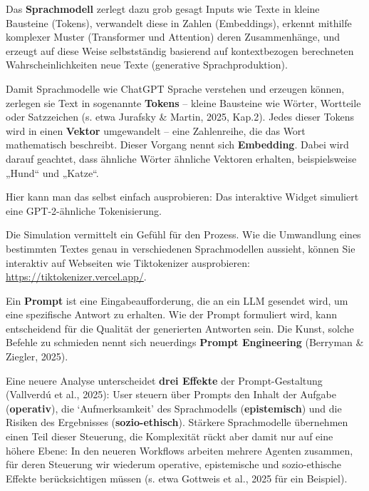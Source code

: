 \documentclass[
  ngerman,
  letterpaper,
  DIV=11]{scrreprt}
\begin{document}
Das \textbf{Sprachmodell} zerlegt dazu grob gesagt Inputs wie Texte in
kleine Bausteine (Tokens), verwandelt diese in Zahlen (Embeddings),
erkennt mithilfe komplexer Muster (Transformer und Attention) deren
Zusammenhänge, und erzeugt auf diese Weise selbstständig basierend auf
kontextbezogen berechneten Wahrscheinlichkeiten neue Texte (generative
Sprachproduktion).

Damit Sprachmodelle wie ChatGPT Sprache verstehen und erzeugen können,
zerlegen sie Text in sogenannte \textbf{Tokens} -- kleine Bausteine wie
Wörter, Wortteile oder Satzzeichen (s. etwa Jurafsky \& Martin, 2025,
Kap.2). Jedes dieser Tokens wird in einen \textbf{Vektor} umgewandelt --
eine Zahlenreihe, die das Wort mathematisch beschreibt. Dieser Vorgang
nennt sich \textbf{Embedding}. Dabei wird darauf geachtet, dass ähnliche
Wörter ähnliche Vektoren erhalten, beispielsweise „Hund`` und „Katze``.

Hier kann man das selbst einfach ausprobieren: Das interaktive Widget
simuliert eine GPT-2-ähnliche Tokenisierung.

\begin{tcolorbox}[enhanced jigsaw, left=2mm, bottomrule=.15mm, arc=.35mm, rightrule=.15mm, colframe=quarto-callout-tip-color-frame, coltitle=black, colback=white, toprule=.15mm, toptitle=1mm, colbacktitle=quarto-callout-tip-color!10!white, title=\textcolor{quarto-callout-tip-color}{\faLightbulb}\hspace{0.5em}{Geben Sie eigenen Text ein, unten wird er dann in Tokens und Zahlen
umgewandelt}, opacitybacktitle=0.6, leftrule=.75mm, bottomtitle=1mm, titlerule=0mm, opacityback=0, breakable]

\end{tcolorbox}

Die Simulation vermittelt ein Gefühl für den Prozess. Wie die Umwandlung
eines bestimmten Textes genau in verschiedenen Sprachmodellen aussieht,
können Sie interaktiv auf Webseiten wie Tiktokenizer ausprobieren:
\url{https://tiktokenizer.vercel.app/}.

Ein \textbf{Prompt} ist eine Eingabeaufforderung, die an ein LLM
gesendet wird, um eine spezifische Antwort zu erhalten. Wie der Prompt
formuliert wird, kann entscheidend für die Qualität der generierten
Antworten sein. Die Kunst, solche Befehle zu schmieden nennt sich
neuerdings \textbf{Prompt Engineering} (Berryman \& Ziegler, 2025).

Eine neuere Analyse unterscheidet \textbf{drei Effekte} der
Prompt-Gestaltung (Vallverdú et al., 2025): User steuern über Prompts
den Inhalt der Aufgabe (\textbf{operativ}), die `Aufmerksamkeit' des
Sprachmodells (\textbf{epistemisch}) und die Risiken des Ergebnisses
(\textbf{sozio-ethisch}). Stärkere Sprachmodelle übernehmen einen Teil
dieser Steuerung, die Komplexität rückt aber damit nur auf eine höhere
Ebene: In den neueren Workflows arbeiten mehrere Agenten zusammen, für
deren Steuerung wir wiederum operative, epistemische und sozio-ethische
Effekte berücksichtigen müssen (s. etwa Gottweis et al., 2025 für ein
Beispiel).
\end{document}
